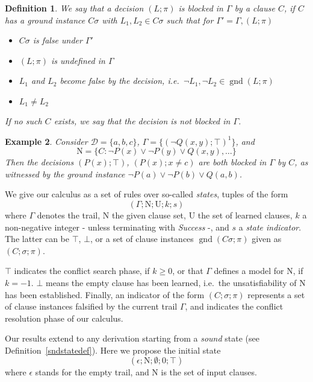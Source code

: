 \documentclass[a4paper]{article}
\newcommand{\mGnd}{\operatorname{gnd}} \newcommand{\mLVar}{\operatorname{lvar}} \newcommand{\mRVar}{\operatorname{rvar}} \newcommand{\mDmn}{\operatorname{dom}} \newcommand{\mRng}{\operatorname{rng}} \newcommand{\mMGU}{\operatorname{mgu}} \newcommand{\mDef}{\operatorname{def}} \newcommand{\mDomain}{\mathcal{D}} \newcommand{\mVar}{\operatorname{var}}
\newtheorem{defi}{Definition}[section]
\newtheorem{example}[defi]{Example}
\begin{document}
\begin{defi}
We say that \emph{a decision $(L; \pi)$ is blocked in $\Gamma$ by a clause $C$}, if $C$ has 
a ground instance $C\sigma$ with $L_1, L_2 \in C\sigma$ such that for $\Gamma' = \Gamma, (L; \pi)$
\begin{itemize}
	\item $C\sigma$ is false under $\Gamma'$
	\item $(L; \pi)$ is undefined in $\Gamma$
	\item $L_1$ and $L_2$ become false by the decision, i.e.\
		$\neg L_1, \neg L_2 \in \mGnd(L; \pi)$
	\item $L_1 \ne L_2$
\end{itemize}
If no such $C$ exists, we say that \emph{the decision is not blocked in $\Gamma$}.
\end{defi}

\begin{example} Consider $\mDomain = \{a, b, c\}$, $\Gamma = \{(\neg Q(x,y); \top)^1\}$, and 
\[\text{N} = \{ C: \neg P(x) \lor \neg P(y) \lor Q(x,y), \dots \}\]
Then the decisions $(P(x); \top)$, $(P(x); x \ne c)$ are both blocked in $\Gamma$ by $C$, as 
witnessed by the ground instance $\neg P(a) \lor \neg P(b) \lor Q(a,b)$.
\end{example}

\noindent
We give our calculus as a set of rules over so-called \emph{states}, tuples of the form
\[(\Gamma; \text{N}; \text{U}; k; s)\]
where $\Gamma$ denotes the trail, $\text{N}$ the given clause set, $\text{U}$ the set of learned clauses,
$k$ a non-negative integer - unless terminating with \emph{Success} -, and $s$ a \emph{state indicator}. 
The latter can be $\top$, $\bot$, or a set of clause instances $\mGnd(C\sigma;\pi)$ given as $(C; \sigma; \pi)$.

$\top$ indicates the conflict search phase, if $k\geq 0$, or that $\Gamma$ defines a model for $\text{N}$, if $k = -1$. 
$\bot$ means the empty clause has been learned, i.e.\ 
the unsatisfiability of $\text{N}$ has been established.
Finally, an indicator of the form $(C; \sigma; \pi)$ represents a set of clause instances falsified by the current trail $\Gamma$, 
and indicates the conflict resolution phase of our calculus.

Our results extend to any derivation starting from a \emph{sound} state (see Definition~\ref{sndstatedef}). 
Here we propose the initial state 
\[(\epsilon; \text{N}; \emptyset; 0; \top)\]
where $\epsilon$ stands for the empty trail, and $\text{N}$ is the set of input clauses.
\end{document}

